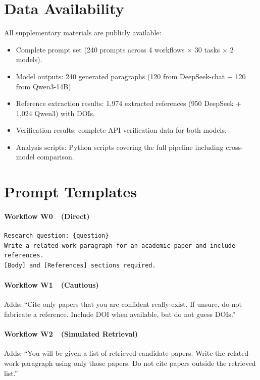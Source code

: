 \documentclass[11pt,a4paper]{article}
\newcommand{\wzero}{W0~}
\newcommand{\wone}{W1~}
\newcommand{\wtwo}{W2~}
\begin{document}
\newpage
\appendix

\section{Data Availability}

All supplementary materials are publicly available:

\begin{itemize}[nosep]
    \item Complete prompt set (240 prompts across 4 workflows $\times$ 30 tasks $\times$ 2 models).
    \item Model outputs: 240 generated paragraphs (120 from DeepSeek-chat + 120 from Qwen3-14B).
    \item Reference extraction results: 1,974 extracted references (950 DeepSeek + 1,024 Qwen3) with DOIs.
    \item Verification results: complete API verification data for both models.
    \item Analysis scripts: Python scripts covering the full pipeline including cross-model comparison.
\end{itemize}

\section{Prompt Templates}

\paragraph{Workflow \wzero\ (Direct)}
\begin{verbatim}
Research question: {question}
Write a related-work paragraph for an academic paper and include references.
[Body] and [References] sections required.
\end{verbatim}

\paragraph{Workflow \wone\ (Cautious)}
Adds: ``Cite only papers that you are confident really exist. If unsure, do not fabricate a reference. Include DOI when available, but do not guess DOIs.''

\paragraph{Workflow \wtwo\ (Simulated Retrieval)}
Adds: ``You will be given a list of retrieved candidate papers. Write the related-work paragraph using only those papers. Do not cite papers outside the retrieved list.''
\end{document}
